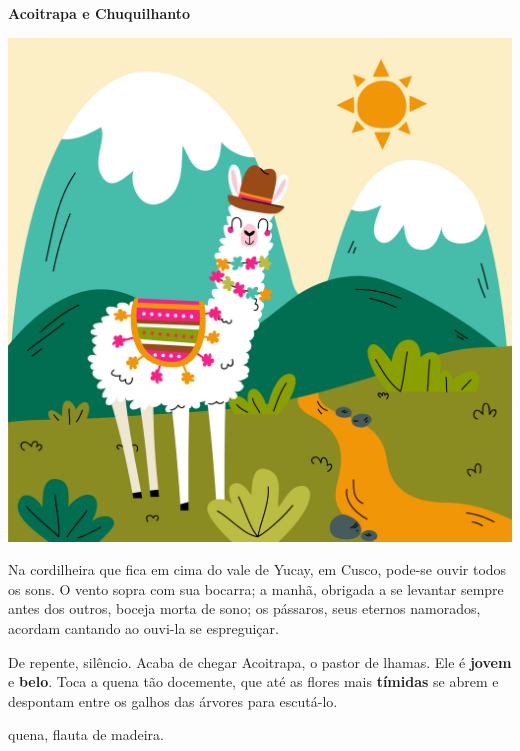 \begin{myquote}
\textbf{Acoitrapa e Chuquilhanto}

\begin{center}
\includegraphics[width=\textwidth]{media/image24b.jpg}
\end{center}

Na cordilheira que fica em cima do vale de Yucay, em Cusco,
pode-se ouvir todos os sons. O vento sopra com sua bocarra;
a manhã, obrigada a se levantar sempre antes dos outros,
boceja morta de sono; os pássaros, seus eternos namorados,
acordam cantando ao ouvi-la se espreguiçar.

De repente, silêncio. Acaba de chegar Acoitrapa, o
pastor de lhamas. Ele é \textbf{jovem} e \textbf{belo}. Toca a quena tão
docemente, que até as flores mais \textbf{tímidas} se abrem e
despontam entre os galhos das árvores para escutá-lo. 


\begin{small}
 quena, flauta de madeira.
\end{small}
\end{myquote}

